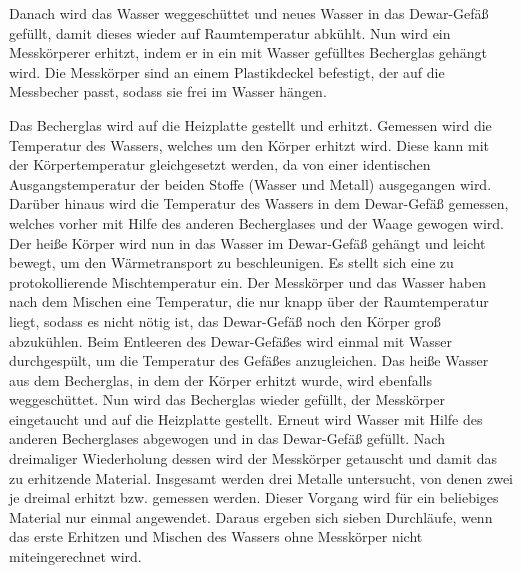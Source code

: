Danach wird das Wasser weggeschüttet und neues Wasser in das Dewar-Gefäß gefüllt, damit dieses wieder auf Raumtemperatur abkühlt.
Nun wird ein Messkörperer erhitzt, indem er in ein mit Wasser gefülltes Becherglas gehängt wird. Die Messkörper sind an einem Plastikdeckel befestigt, der auf %
die Messbecher passt, sodass sie frei im Wasser hängen.

Das Becherglas wird auf die Heizplatte gestellt und erhitzt. 
Gemessen wird die Temperatur des Wassers, welches um den Körper erhitzt wird. 
Diese kann mit der Körpertemperatur gleichgesetzt werden, da von einer identischen Ausgangstemperatur der beiden Stoffe (Wasser und Metall) ausgegangen wird. %
Darüber hinaus wird die Temperatur des Wassers in dem Dewar-Gefäß gemessen, welches vorher mit Hilfe des anderen Becherglases und der Waage gewogen wird. %
Der heiße Körper wird nun in das Wasser im Dewar-Gefäß gehängt und leicht bewegt, um den Wärmetransport zu beschleunigen.
Es stellt sich eine zu protokollierende Mischtemperatur ein. Der Messkörper und das Wasser haben nach dem Mischen eine Temperatur, %
die nur knapp über der Raumtemperatur liegt, sodass es nicht nötig ist, das Dewar-Gefäß noch den Körper groß abzukühlen.
Beim Entleeren des Dewar-Gefäßes wird einmal mit Wasser durchgespült, um die Temperatur des Gefäßes anzugleichen.
Das heiße Wasser aus dem Becherglas, in dem der Körper erhitzt wurde, wird ebenfalls weggeschüttet.
Nun wird das Becherglas wieder gefüllt, der Messkörper eingetaucht und auf die Heizplatte gestellt. %
Erneut wird Wasser mit Hilfe des anderen Becherglases abgewogen und in das Dewar-Gefäß gefüllt. %
Nach dreimaliger Wiederholung dessen wird der Messkörper getauscht und damit das zu erhitzende Material. %
Insgesamt werden drei Metalle untersucht, von denen zwei je dreimal erhitzt bzw. gemessen werden. Dieser Vorgang wird für ein beliebiges Material nur einmal angewendet. %
Daraus ergeben sich sieben Durchläufe, wenn das erste Erhitzen und Mischen des Wassers ohne Messkörper nicht miteingerechnet wird.

\pagebreak